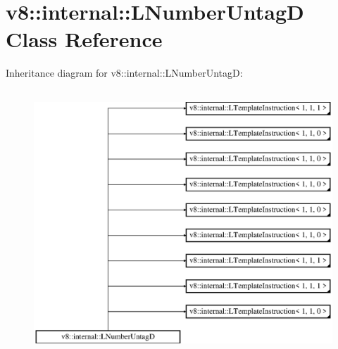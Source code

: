 \hypertarget{classv8_1_1internal_1_1_l_number_untag_d}{}\section{v8\+:\+:internal\+:\+:L\+Number\+UntagD Class Reference}
\label{classv8_1_1internal_1_1_l_number_untag_d}
Inheritance diagram for v8\+:\+:internal\+:\+:L\+Number\+UntagD\+:\begin{figure}[H]
\begin{center}
\leavevmode
\includegraphics[height=10.000000cm]{classv8_1_1internal_1_1_l_number_untag_d}
\end{center}
\end{figure}
